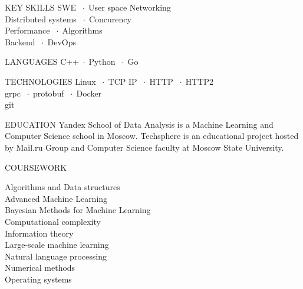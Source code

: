 \documentclass[12pt]{cutecv}
\author{Svyatoslav Feldsherov}
\newcommand{\listbullet}{$\; \cdot \;$}
\begin{document}
\maketitle

\begin{paracol}{2}
\setlength{\columnsep}{2em}
\setlength{\cvsectionverticalskip}{1mm}
\setlength{\cvinfoverticalskip}{1mm}

\begin{leftcolumn}
\begin{cvsection}{KEY SKILLS}
  SWE \listbullet User space Networking  \\
   Distributed systems \listbullet Concurency  \\
   Performance \listbullet Algorithms \\
   Backend \listbullet DevOps 
\end{cvsection}

\begin{cvsection}{LANGUAGES}
  C++\listbullet Python \listbullet Go
\end{cvsection}

\begin{cvsection}{TECHNOLOGIES}
  Linux \listbullet TCP IP  \listbullet  HTTP \listbullet  HTTP2 \\
  grpc \listbullet protobuf \listbullet Docker \\
  git \\
\end{cvsection}

\begin{cvsection}{EDUCATION}
    {Yandex School of Data Analysis is a Machine Learning
     and Computer Science school in Moscow.}
   {Techsphere is an educational project hosted
    by Mail.ru Group and Computer Science faculty
    at Moscow State University.}
\end{cvsection}


\begin{cvsection}{COURSEWORK}

  {\HLight
    Algorithms and Data structures\\
    Advanced Machine Learning\\
    Bayesian Methods for Machine Learning\\
    Computational complexity\\
    Information theory\\
    Large-scale machine learning\\
    Natural language processing\\
    Numerical methods\\
    Operating systems\\
  }
\end{cvsection}


\end{leftcolumn}
\end{paracol}
\end{document}
